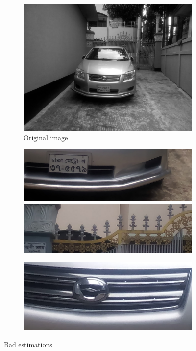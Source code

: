 \begin{figure}
\begin{subfigure}{0.5\textwidth}
    \centering
    \includegraphics[width=0.9\linewidth]{./img/experiment/stage.2/small}
    \caption{Original image}
\end{subfigure}
\begin{subfigure}{0.24\textwidth}
    \centering
    \includegraphics[width=0.9\linewidth]{./img/experiment/stage.8/00-small}
    \\ \vspace{0.3cm}
    \includegraphics[width=0.9\linewidth]{./img/experiment/stage.8/02-small}
\end{subfigure}
\begin{subfigure}{0.24\textwidth}
    \centering
    \includegraphics[width=0.9\linewidth]{./img/experiment/stage.8/01-small}
\end{subfigure}
\caption{Bad estimations}
\label{fig:Estimate3}
\end{figure}

